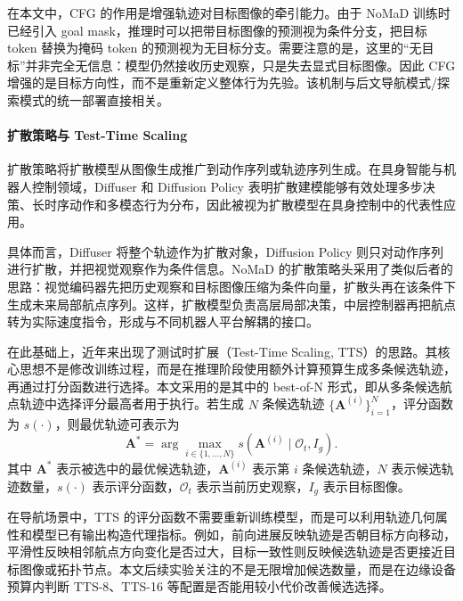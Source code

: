 在本文中，CFG 的作用是增强轨迹对目标图像的牵引能力。由于 NoMaD 训练时已经引入 goal mask，推理时可以把带目标图像的预测视为条件分支，把目标 token 替换为掩码 token 的预测视为无目标分支。需要注意的是，这里的``无目标''并非完全无信息：模型仍然接收历史观察，只是失去显式目标图像。因此 CFG 增强的是目标方向性，而不是重新定义整体行为先验。该机制与后文导航模式/探索模式的统一部署直接相关。

\paragraph*{扩散策略与 Test-Time Scaling}

扩散策略将扩散模型从图像生成推广到动作序列或轨迹序列生成\cite{diffuser2022,chi2025diffusion}。在具身智能与机器人控制领域，Diffuser 和 Diffusion Policy 表明扩散建模能够有效处理多步决策、长时序动作和多模态行为分布，因此被视为扩散模型在具身控制中的代表性应用。

具体而言，Diffuser\cite{diffuser2022} 将整个轨迹作为扩散对象，Diffusion Policy\cite{chi2025diffusion} 则只对动作序列进行扩散，并把视觉观察作为条件信息。NoMaD 的扩散策略头采用了类似后者的思路：视觉编码器先把历史观察和目标图像压缩为条件向量，扩散头再在该条件下生成未来局部航点序列。这样，扩散模型负责高层局部决策，中层控制器再把航点转为实际速度指令，形成与不同机器人平台解耦的接口。

在此基础上，近年来出现了测试时扩展（Test-Time Scaling, TTS）的思路\cite{ttsdiffusion2025,ttssearch2025}。其核心思想不是修改训练过程，而是在推理阶段使用额外计算预算生成多条候选轨迹，再通过打分函数进行选择。本文采用的是其中的 best-of-N 形式，即从多条候选航点轨迹中选择评分最高者用于执行。若生成 $N$ 条候选轨迹 $\{\mathbf{A}^{(i)}\}_{i=1}^N$，评分函数为 $s(\cdot)$，则最优轨迹可表示为
\begin{equation}
\mathbf{A}^{\ast} = \arg\max_{i\in\{1,\ldots,N\}} s\!\left(\mathbf{A}^{(i)} \mid \mathcal{O}_t, I_g\right).
\end{equation}
其中 $\mathbf{A}^{\ast}$ 表示被选中的最优候选轨迹，$\mathbf{A}^{(i)}$ 表示第 $i$ 条候选轨迹，$N$ 表示候选轨迹数量，$s(\cdot)$ 表示评分函数，$\mathcal{O}_t$ 表示当前历史观察，$I_g$ 表示目标图像。

在导航场景中，TTS 的评分函数不需要重新训练模型，而是可以利用轨迹几何属性和模型已有输出构造代理指标。例如，前向进展反映轨迹是否朝目标方向移动，平滑性反映相邻航点方向变化是否过大，目标一致性则反映候选轨迹是否更接近目标图像或拓扑节点。本文后续实验关注的不是无限增加候选数量，而是在边缘设备预算内判断 TTS-8、TTS-16 等配置是否能用较小代价改善候选选择。


